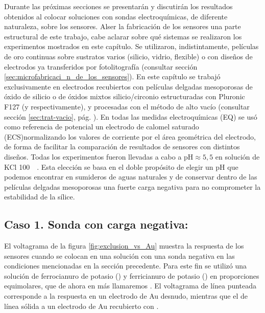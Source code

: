 	 Durante las próximas secciones se presentarán y discutirán los resultados obtenidos al colocar soluciones con sondas electroquímicas, de diferente naturaleza, sobre los sensores. Al\space ser la fabricación de los sensores una parte estructural de este trabajo, cabe aclarar sobre qué sistemas se realizaron los experimentos mostrados en este capítulo. Se utilizaron, indistintamente, películas de oro continuas sobre sustratos varios (silicio, vidrio, flexible) o con diseños de electrodos ya transferidos por fotolitografía (consultar sección \ref{sec:microfabricaci_n_de_los_sensores}). En este capítulo se trabajó exclusivamente en electrodos recubiertos con películas delgadas mesoporosas de óxido de silicio o de óxidos mixtos silicio/circonio estructuradas con Pluronic F127 (\pdmF\space y \pdmZ\space respectivamente), y procesadas con el método de alto vacío (consultar sección \ref{sec:trat-vacio}, pág. \pageref{sec:trat-vacio}). En todas las medidas electroquímicas (EQ) se usó como referencia de potencial un electrodo de calomel saturado (ECS)normalizando los valores de corriente por el área geométrica del electrodo, de forma de facilitar la comparación de resultados de sensores con distintos diseños. Todas los experimentos fueron llevadas a cabo a $\text{pH}\approx5,5$ en solución de KCl \SI{100}{\milli\Molar}. Esta elección se basa en el doble propósito de elegir un pH que podemos encontrar en sumideros de aguas naturales y de conservar dentro de las películas delgadas mesoporosas una fuerte carga negativa para no comprometer la estabilidad de la sílice.

	\subsection{Caso 1. Sonda con carga negativa: \texorpdfstring{\ferroferri}{ferroferri}}

	 El voltagrama de la figura \ref{fig:exclusion_vs_Au} muestra la respuesta de los sensores cuando se colocan en una solución con una sonda negativa en las condiciones mencionadas en la sección precedente. Para este fin se utilizó una solución de ferrocianuro de potasio (\ferroCompleto) y ferricianuro de potasio (\ferriCompleto) en proporciones equimolares, que de ahora en más llamaremos \fe. El voltagrama de línea punteada corresponde a la respuesta en un electrodo de Au  desnudo, mientras que el de línea sólida a un electrodo de Au  recubierto con \pdmF.
	
